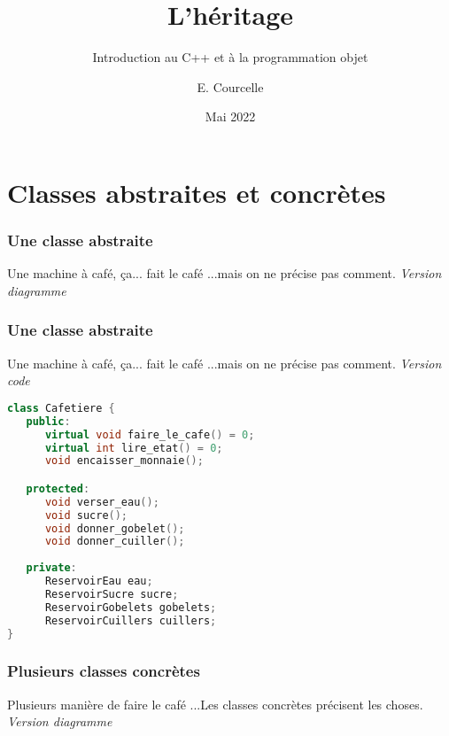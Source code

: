 \documentclass{beamer}
\title{L'héritage}
\subtitle{Introduction au C++ et à la programmation objet}
\author{E. Courcelle}\institute{CALMIP, URA 3667}
\date{Mai 2022}
\begin{document}
\begin{frame}
\titlepage
\end{frame}

\begin{frame}
\tableofcontents
\end{frame}

\section{Classes abstraites et concrètes}

\begin{frame}[fragile=singleslide,shrink=20]
\frametitle {Une classe abstraite}

\begin{block}{Une machine à café, ça... fait le café}
...mais on ne précise pas comment. \em{Version diagramme}
\end{block}

\begin{centering}%
%
\par%
\end{centering}%
\end{frame}

\begin{frame}[fragile=singleslide,shrink=20]
\frametitle {Une classe abstraite}

\begin{block}{Une machine à café, ça... fait le café}
...mais on ne précise pas comment. \em{Version code}
\end{block}
\begin{lstlisting}[language=c++]
class Cafetiere {
   public:
      virtual void faire_le_cafe() = 0;
      virtual int lire_etat() = 0;
      void encaisser_monnaie();

   protected:
      void verser_eau();
      void sucre();
      void donner_gobelet();
      void donner_cuiller();
      
   private:
      ReservoirEau eau;
      ReservoirSucre sucre;
      ReservoirGobelets gobelets;
      ReservoirCuillers cuillers;
}
\end{lstlisting}
\end{frame}

\begin{frame}[fragile=singleslide,shrink=20]
\frametitle {Plusieurs classes concrètes}

\begin{block}{Plusieurs manière de faire le café}
...Les classes concrètes précisent les choses. \em{Version diagramme}
\end{block}

\begin{centering}%
%
\par%
\end{centering}%
\end{frame}
\end{document}
